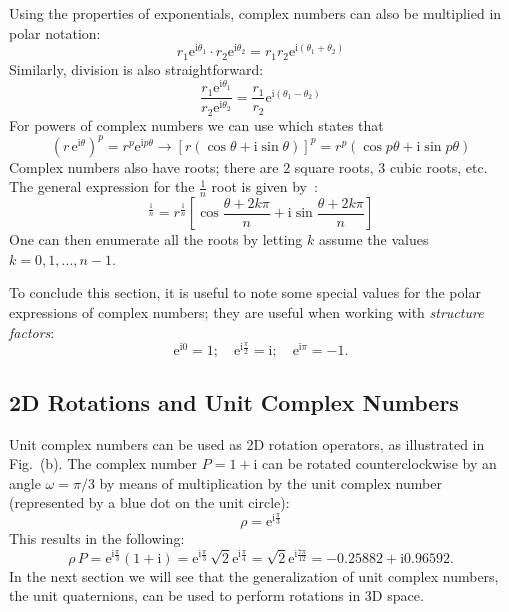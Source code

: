 Using the properties of exponentials, complex numbers can also be multiplied in polar notation:
\begin{equation}
	r_1\mathrm{e}^{\mathrm{i}\theta_1}\cdot r_2\mathrm{e}^{\mathrm{i}\theta_2}=r_1r_2\mathrm{e}^{\mathrm{i}(\theta_1+\theta_2)}
\end{equation}
Similarly, division is also straightforward:
\begin{equation}
	\frac{r_1\mathrm{e}^{\mathrm{i}\theta_1}}{r_2\mathrm{e}^{\mathrm{i}\theta_2}}=\frac{r_1}{r_2}\mathrm{e}^{\mathrm{i}(\theta_1-\theta_2)}
\end{equation}
For powers of complex numbers we can use  which states that
\begin{equation}
	\left(r\,\mathrm{e}^{\mathrm{i}\theta}\right)^p= r^p\mathrm{e}^{\mathrm{i}p\theta} \rightarrow [r(\cos\theta+\mathrm{i}\sin\theta)]^p=r^p(\cos p\theta+\mathrm{i}\sin p\theta)
\end{equation}
Complex numbers also have roots;  there are 2 square roots, 3 cubic roots, etc.  The general expression for the $\frac{1}{n}$ root is given by~:
\begin{equation}
[r(\cos\theta+\mathrm{i}\sin\theta)]^{\frac{1}{n}}=r^{\frac{1}{n}}\left[\cos\frac{\theta+2k\pi}{n}+\mathrm{i}\sin\frac{\theta+2k\pi}{n}\right]
\end{equation}
One can then enumerate all the roots by letting $k$ assume the values $k=0,1,\ldots,n-1$.

To conclude this section, it is useful to note some special values for the polar expressions of complex numbers; they are useful when working with  \textit{structure factors}:
\begin{equation}
	\mathrm{e}^{\mathrm{i}0} = 1;\quad \mathrm{e}^{\mathrm{i}\frac{\pi}{2}} = \mathrm{i};\quad \mathrm{e}^{\mathrm{i}\pi} = -1.
\end{equation}

\subsection{2D Rotations and Unit Complex Numbers}

Unit complex numbers can be used as 2D rotation operators, as illustrated in Fig.~(b). The complex number $P=1+\mathrm{i}$ can be rotated counterclockwise by an angle $\omega=\pi/3$ by means of multiplication by the unit complex number (represented by a blue dot on the unit circle):
\begin{equation}
	\rho=\mathrm{e}^{\mathrm{i}\frac{\pi}{3}}
\end{equation}
This results in the following:
\begin{equation}
	\rho\,P = \mathrm{e}^{\mathrm{i}\frac{\pi}{3}} (1+\mathrm{i}) = \mathrm{e}^{\mathrm{i}\frac{\pi}{3}}\,\sqrt{2}\mathrm{e}^{\mathrm{i}\frac{\pi}{4}}=
	\sqrt{2}\mathrm{e}^{\mathrm{i}\frac{7\pi}{12}} = -0.25882 + \mathrm{i} 0.96592.
\end{equation}
In the next section we will see that the generalization of unit complex numbers, the unit quaternions, can be used to perform rotations in 3D space.


